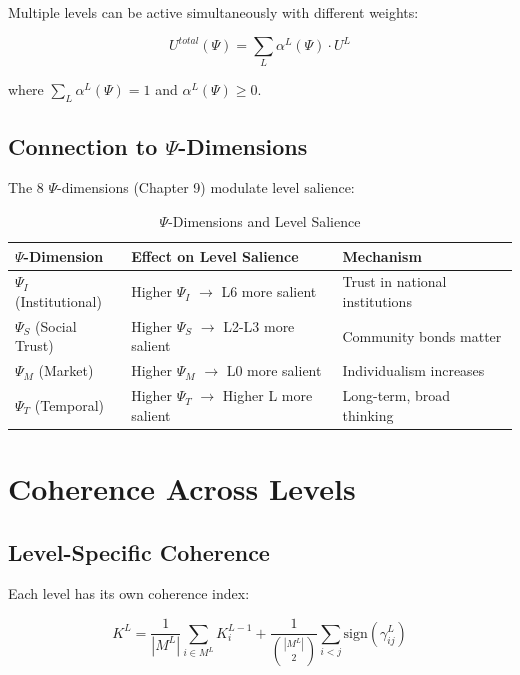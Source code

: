Multiple levels can be active simultaneously with different weights:

\begin{equation}
U^{total}(\Psi) = \sum_L \alpha^L(\Psi) \cdot U^L
\end{equation}

where $\sum_L \alpha^L(\Psi) = 1$ and $\alpha^L(\Psi) \geq 0$.

\subsection{Connection to $\Psi$-Dimensions}

The 8 $\Psi$-dimensions (Chapter 9) modulate level salience:

\begin{table}[htbp]
\centering
\caption{$\Psi$-Dimensions and Level Salience}
\label{tab:aaa-psi-levels}
\renewcommand{\arraystretch}{1.3}
\begin{tabular}{@{}lll@{}}
\toprule
\textbf{$\Psi$-Dimension} & \textbf{Effect on Level Salience} & \textbf{Mechanism} \\
\midrule
$\Psi_I$ (Institutional) & Higher $\Psi_I$ $\to$ L6 more salient & Trust in national institutions \\
$\Psi_S$ (Social Trust) & Higher $\Psi_S$ $\to$ L2-L3 more salient & Community bonds matter \\
$\Psi_M$ (Market) & Higher $\Psi_M$ $\to$ L0 more salient & Individualism increases \\
$\Psi_T$ (Temporal) & Higher $\Psi_T$ $\to$ Higher L more salient & Long-term, broad thinking \\
\bottomrule
\end{tabular}
\end{table}

\section{Coherence Across Levels}
\label{sec:aaa-coherence}

\subsection{Level-Specific Coherence}

Each level has its own coherence index:

\begin{equation}
K^L = \frac{1}{|M^L|} \sum_{i \in M^L} K^{L-1}_i + \frac{1}{\binom{|M^L|}{2}} \sum_{i < j} \text{sign}(\gamma^L_{ij})
\end{equation}

